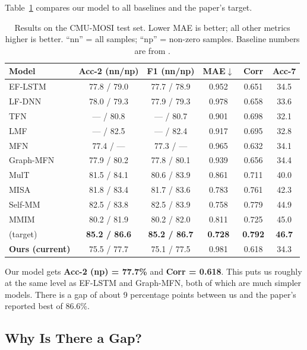 \documentclass[11pt,twocolumn]{article}
\begin{document}
Table~\ref{tab:mosi_results} compares our model to all baselines and the paper's target.

\begin{table}[t]
\centering
\small
\begin{tabular}{lccccc}
\toprule
\textbf{Model} & \textbf{Acc-2 (nn/np)} & \textbf{F1 (nn/np)} & \textbf{MAE$\downarrow$} & \textbf{Corr} & \textbf{Acc-7} \\
\midrule
EF-LSTM         & 77.8 / 79.0 & 77.7 / 78.9 & 0.952 & 0.651 & 34.5 \\
LF-DNN          & 78.0 / 79.3 & 77.9 / 79.3 & 0.978 & 0.658 & 33.6 \\
TFN             & --- / 80.8  & --- / 80.7  & 0.901 & 0.698 & 32.1 \\
LMF             & --- / 82.5  & --- / 82.4  & 0.917 & 0.695 & 32.8 \\
MFN             & 77.4 / ---  & 77.3 / ---  & 0.965 & 0.632 & 34.1 \\
Graph-MFN       & 77.9 / 80.2 & 77.8 / 80.1 & 0.939 & 0.656 & 34.4 \\
MulT            & 81.5 / 84.1 & 80.6 / 83.9 & 0.861 & 0.711 & 40.0 \\
MISA            & 81.8 / 83.4 & 81.7 / 83.6 & 0.783 & 0.761 & 42.3 \\
Self-MM         & 82.5 / 83.8 & 82.5 / 83.9 & 0.758 & 0.779 & 44.9 \\
MMIM            & 80.2 / 81.9 & 80.2 / 82.0 & 0.811 & 0.725 & 45.0 \\
\midrule
\citet{cai2025multimodal} (target) & \textbf{85.2 / 86.6} & \textbf{85.2 / 86.7} & \textbf{0.728} & \textbf{0.792} & \textbf{46.7} \\
\midrule
\textbf{Ours (current)} & 75.5 / 77.7 & 75.1 / 77.5 & 0.981 & 0.618 & 34.3 \\
\bottomrule
\end{tabular}
\caption{Results on the CMU-MOSI test set. Lower MAE is better; all other metrics higher is better. ``nn'' = all samples; ``np'' = non-zero samples. Baseline numbers are from \citet{cai2025multimodal}.}
\label{tab:mosi_results}
\end{table}

Our model gets \textbf{Acc-2 (np) = 77.7\%} and \textbf{Corr = 0.618}. This puts us roughly at the same level as EF-LSTM and Graph-MFN, both of which are much simpler models. There is a gap of about 9 percentage points between us and the paper's reported best of 86.6\%.

\subsection{Why Is There a Gap?}
\end{document}
